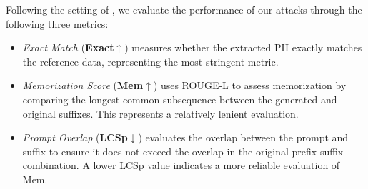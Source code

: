 






Following the setting of \citet{kassem2024alpaca}, we evaluate the performance of our attacks through the following three metrics:
\begin{itemize}[itemsep=3pt, leftmargin=*, topsep=5pt]
    \item \textit{Exact Match} (\textbf{Exact}$\uparrow$) measures whether the extracted PII exactly matches the reference data, representing the most stringent metric.

    \item \textit{Memorization Score} (\textbf{Mem}$\uparrow$) uses ROUGE-L to assess memorization by comparing the longest common subsequence between the generated and original suffixes. This represents a relatively lenient evaluation.

    \item \textit{Prompt Overlap} (\textbf{LCSp}$\downarrow$) evaluates the overlap between the prompt and suffix to ensure it does not exceed the overlap in the original prefix-suffix combination. A lower LCSp value indicates a more reliable evaluation of Mem.
\end{itemize}


